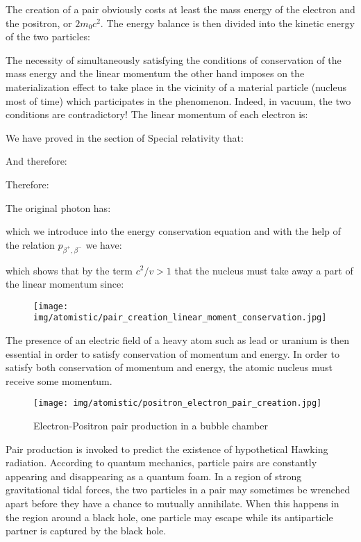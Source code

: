 	The creation of a pair obviously costs at least the mass energy of the electron and the positron, or $2m_0c^2$. The energy balance is then divided into the kinetic energy of the two particles:
	
	The necessity of simultaneously satisfying the conditions of conservation of the mass energy and the linear momentum the other hand imposes on the materialization effect to take place in the vicinity of a material particle (nucleus most of time) which participates in the phenomenon. Indeed, in vacuum, the two conditions are contradictory! The linear momentum of each electron is:
	
	We have proved in the section of Special relativity that:
	
	And therefore:
	
	Therefore:
	
	The original photon has:
	
	which we introduce into the energy conservation equation and with the help of the relation $p_{\beta^+,\beta^-}$ we have:
	
	which shows that by the term $c^2/v>1$ that the nucleus must take away a part of the linear momentum since:
	
	\begin{figure}[H]
		\centering
		\texttt{[image: img/atomistic/pair\_creation\_linear\_moment\_conservation.jpg]}
	\end{figure}
	The presence of an electric field of a heavy atom such as lead or uranium is then essential in order to satisfy conservation of momentum and energy. In order to satisfy both conservation of momentum and energy, the atomic nucleus must receive some momentum.
	
	\begin{figure}[H]
		\centering
		\texttt{[image: img/atomistic/positron\_electron\_pair\_creation.jpg]}
		\caption{Electron-Positron pair production in a bubble chamber}
	\end{figure}
	\begin{tcolorbox}[title=Remark,colframe=black,arc=10pt]
	Pair production is invoked to predict the existence of hypothetical Hawking radiation. According to quantum mechanics, particle pairs are constantly appearing and disappearing as a quantum foam. In a region of strong gravitational tidal forces, the two particles in a pair may sometimes be wrenched apart before they have a chance to mutually annihilate. When this happens in the region around a black hole, one particle may escape while its antiparticle partner is captured by the black hole.
	\end{tcolorbox}
	
